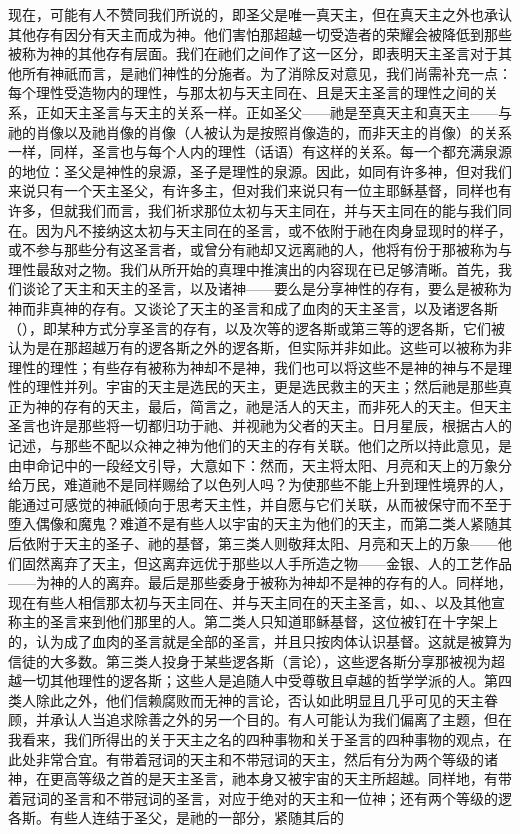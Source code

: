 现在，可能有人不赞同我们所说的，即圣父是唯一真天主，但在真天主之外也承认其他存有因分有天主而成为神。他们害怕那超越一切受造者的荣耀会被降低到那些被称为神的其他存有层面。我们在祂们之间作了这一区分，即表明天主圣言对于其他所有神祇而言，是祂们神性的分施者。为了消除反对意见，我们尚需补充一点：每个理性受造物内的理性，与那太初与天主同在、且是天主圣言的理性之间的关系，正如天主圣言与天主的关系一样。正如圣父——祂是至真天主和真天主——与祂的肖像以及祂肖像的肖像（人被认为是按照肖像造的，而非天主的肖像）的关系一样，同样，圣言也与每个人内的理性（话语）有这样的关系。每一个都充满泉源的地位：圣父是神性的泉源，圣子是理性的泉源。因此，如同有许多神，但对我们来说只有一个天主圣父，有许多主，但对我们来说只有一位主耶稣基督，同样也有许多，但就我们而言，我们祈求那位太初与天主同在，并与天主同在的能与我们同在。因为凡不接纳这太初与天主同在的圣言，或不依附于祂在肉身显现时的样子，或不参与那些分有这圣言者，或曾分有祂却又远离祂的人，他将有份于那被称为与理性最敌对之物。我们从所开始的真理中推演出的内容现在已足够清晰。首先，我们谈论了天主和天主的圣言，以及诸神——要么是分享神性的存有，要么是被称为神而非真神的存有。又谈论了天主的圣言和成了血肉的天主圣言，以及诸逻各斯（），即某种方式分享圣言的存有，以及次等的逻各斯或第三等的逻各斯，它们被认为是在那超越万有的逻各斯之外的逻各斯，但实际并非如此。这些可以被称为非理性的理性；有些存有被称为神却不是神，我们也可以将这些不是神的神与不是理性的理性并列。宇宙的天主是选民的天主，更是选民救主的天主；然后祂是那些真正为神的存有的天主，最后，简言之，祂是活人的天主，而非死人的天主。但天主圣言也许是那些将一切都归功于祂、并视祂为父者的天主。日月星辰，根据古人的记述，与那些不配以众神之神为他们的天主的存有关联。他们之所以持此意见，是由申命记中的一段经文引导，大意如下：然而，天主将太阳、月亮和天上的万象分给万民，难道祂不是同样赐给了以色列人吗？为使那些不能上升到理性境界的人，能通过可感觉的神祇倾向于思考天主性，并自愿与它们关联，从而被保守而不至于堕入偶像和魔鬼？难道不是有些人以宇宙的天主为他们的天主，而第二类人紧随其后依附于天主的圣子、祂的基督，第三类人则敬拜太阳、月亮和天上的万象——他们固然离弃了天主，但这离弃远优于那些以人手所造之物——金银、人的工艺作品——为神的人的离弃。最后是那些委身于被称为神却不是神的存有的人。同样地，现在有些人相信那太初与天主同在、并与天主同在的天主圣言，如、、以及其他宣称主的圣言来到他们那里的人。第二类人只知道耶稣基督，这位被钉在十字架上的，认为成了血肉的圣言就是全部的圣言，并且只按肉体认识基督。这就是被算为信徒的大多数。第三类人投身于某些逻各斯（言论），这些逻各斯分享那被视为超越一切其他理性的逻各斯；这些人是追随人中受尊敬且卓越的哲学学派的人。第四类人除此之外，他们信赖腐败而无神的言论，否认如此明显且几乎可见的天主眷顾，并承认人当追求除善之外的另一个目的。有人可能认为我们偏离了主题，但在我看来，我们所得出的关于天主之名的四种事物和关于圣言的四种事物的观点，在此处非常合宜。有带着冠词的天主和不带冠词的天主，然后有分为两个等级的诸神，在更高等级之首的是天主圣言，祂本身又被宇宙的天主所超越。同样地，有带着冠词的圣言和不带冠词的圣言，对应于绝对的天主和一位神；还有两个等级的逻各斯。有些人连结于圣父，是祂的一部分，紧随其后的